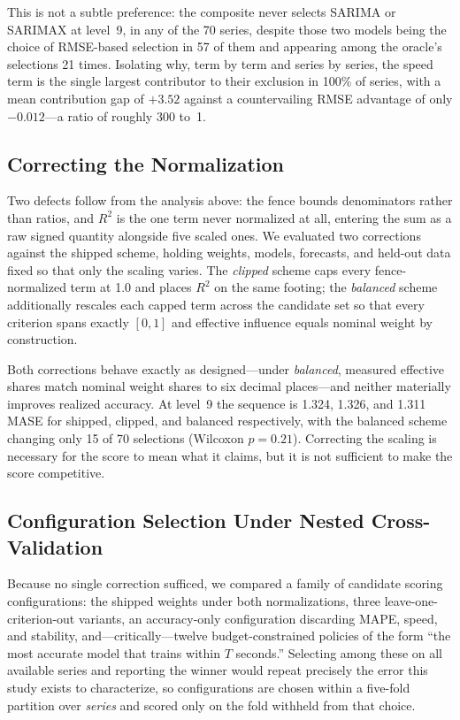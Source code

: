 This is not a subtle preference: the composite never selects SARIMA or SARIMAX at level~9, in any of the 70 series, despite those two models being the choice of RMSE-based selection in 57 of them and appearing among the oracle's selections 21 times. Isolating why, term by term and series by series, the speed term is the single largest contributor to their exclusion in 100\% of series, with a mean contribution gap of $+3.52$ against a countervailing RMSE advantage of only $-0.012$---a ratio of roughly 300 to~1.

\subsection{Correcting the Normalization}
Two defects follow from the analysis above: the fence bounds denominators rather than ratios, and $R^2$ is the one term never normalized at all, entering the sum as a raw signed quantity alongside five scaled ones. We evaluated two corrections against the shipped scheme, holding weights, models, forecasts, and held-out data fixed so that only the scaling varies. The \emph{clipped} scheme caps every fence-normalized term at 1.0 and places $R^2$ on the same footing; the \emph{balanced} scheme additionally rescales each capped term across the candidate set so that every criterion spans exactly $[0,1]$ and effective influence equals nominal weight by construction.

Both corrections behave exactly as designed---under \emph{balanced}, measured effective shares match nominal weight shares to six decimal places---and neither materially improves realized accuracy. At level~9 the sequence is 1.324, 1.326, and 1.311 MASE for shipped, clipped, and balanced respectively, with the balanced scheme changing only 15 of 70 selections (Wilcoxon $p=0.21$). Correcting the scaling is necessary for the score to mean what it claims, but it is not sufficient to make the score competitive.

\subsection{Configuration Selection Under Nested Cross-Validation}
Because no single correction sufficed, we compared a family of candidate scoring configurations: the shipped weights under both normalizations, three leave-one-criterion-out variants, an accuracy-only configuration discarding MAPE, speed, and stability, and---critically---twelve budget-constrained policies of the form ``the most accurate model that trains within $T$ seconds.'' Selecting among these on all available series and reporting the winner would repeat precisely the error this study exists to characterize, so configurations are chosen within a five-fold partition over \emph{series} and scored only on the fold withheld from that choice.

